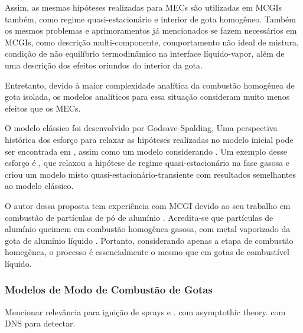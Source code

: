 Assim, as mesmas hipóteses realizadas para MECs são utilizadas em MCGIs também, como regime quasi-estacionário e interior de gota homogêneo.
Também os mesmos problemas e aprimoramentos já mencionados se fazem necessários em MCGIs, como descrição multi-componente, comportamento não ideal de mistura, condição de não equilíbrio termodinâmico na interface líquido-vapor, além de uma descrição dos efeitos oriundos do interior da gota.

Entretanto, devido à maior complexidade analítica da combustão homogênea de gota isolada, os modelos analíticos para essa situação consideram muito menos efeitos que os MECs.

O modelo clássico foi desenvolvido por Godsave-Spalding, 
Uma perspectiva histórica dos esforço para relaxar as hipóteses realizadas no modelo inicial pode ser encontrada em \cite{FachiniF1999}, assim como um modelo considerando .
Um exemplo desse esforço é , que relaxou a hipótese de regime quasi-estacionário na fase gasosa e criou um modelo misto quasi-estacionário-transiente com resultados semelhantes ao modelo clássico.

O autor dessa proposta tem experiência com MCGI devido ao seu trabalho em combustão de partículas de pó de alumínio .
Acredita-se que partículas de alumínio queimem em combustão homogênea gasosa, com metal vaporizado da gota de alumínio líquido \source{}.
Portanto, considerando apenas a etapa de combustão homegênea, o processo é essencialmente o mesmo que em gotas de combustível líquido.


 



\subsubsection{Modelos de Modo de Combustão de Gotas}

Mencionar relevância para ignição de sprays e \cite{AggarwalS2014}.
 com asymptothic theory.
 com DNS para detectar.